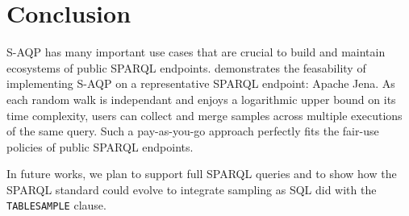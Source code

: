 
\section{Conclusion}

S-AQP has many important use cases that are crucial to build and
maintain ecosystems of public SPARQL endpoints.
%
\NAME demonstrates the feasability of implementing S-AQP on a
representative SPARQL endpoint: Apache Jena.  As each random walk is
independant and enjoys a logarithmic upper bound on its time
complexity, users can collect and merge samples across multiple
executions of the same query. Such a pay-as-you-go approach perfectly
fits the fair-use policies of public SPARQL endpoints.

\noindent In future works, we plan to support full SPARQL queries and
to show how the SPARQL standard could evolve to integrate sampling as
SQL did with the \verb|TABLESAMPLE| clause.
